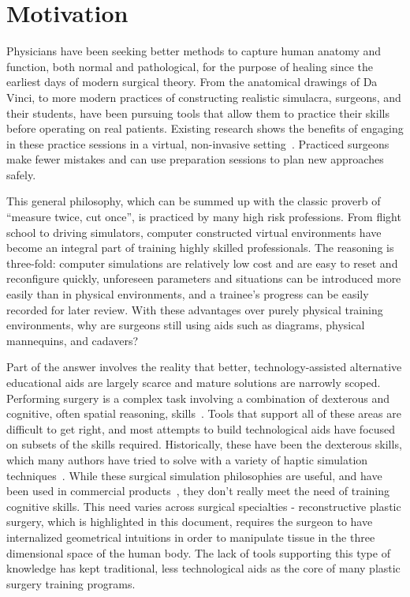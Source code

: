 \section{Motivation}

Physicians have been seeking better methods to capture human anatomy
and function, both normal and pathological, for the purpose of healing
since the earliest days of modern surgical theory. From the anatomical
drawings of Da Vinci, to more modern practices of constructing
realistic simulacra, surgeons, and their students, have been pursuing
tools that allow them to practice their skills before operating on
real patients. Existing research shows the benefits of engaging in
these practice sessions in a virtual, non-invasive
setting~\citep{GallaRCHFMSS:2005}. Practiced surgeons make fewer
mistakes and can use preparation sessions to plan new approaches
safely.

This general philosophy, which can be summed up with the classic
proverb of ``measure twice, cut once'', is practiced by many high risk
professions. From flight school to driving simulators, computer
constructed virtual environments have become an integral part of
training highly skilled professionals. The reasoning is three-fold:
computer simulations are relatively low cost and are easy to reset and
reconfigure quickly, unforeseen parameters and situations can be
introduced more easily than in physical environments, and a trainee's
progress can be easily recorded for later review. With these
advantages over purely physical training environments, why are
surgeons still using aids such as diagrams, physical mannequins, and
cadavers?

Part of the answer involves the reality that better,
technology-assisted alternative educational aids are largely scarce
and mature solutions are narrowly scoped.  Performing surgery is a
complex task involving a combination of dexterous and cognitive, often
spatial reasoning, skills~\citep{GallaRCHFMSS:2005}. Tools that
support all of these areas are difficult to get right, and most
attempts to build technological aids have focused on subsets of the
skills required. Historically, these have been the dexterous skills,
which many authors have tried to solve with a variety of haptic
simulation techniques~\citep{MendoL:2003, LindbT:2007}. While these
surgical simulation philosophies are useful, and have been used in
commercial products~\citep{SUSAC:2002--2014}, they don't really meet
the need of training cognitive skills. This need varies across
surgical specialties - reconstructive plastic surgery, which is
highlighted in this document, requires the surgeon to have
internalized geometrical intuitions in order to manipulate tissue in
the three dimensional space of the human body. The lack of tools
supporting this type of knowledge has kept traditional, less
technological aids as the core of many plastic surgery training
programs.

